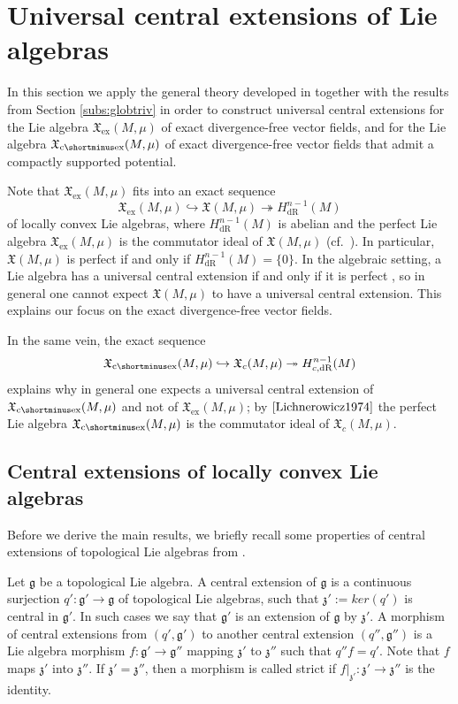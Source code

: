 \documentclass{article}
\newcommand{\ex}{\mathrm{ex}}
\newcommand{\dR}{\mathrm{dR}}
\newcommand{\fX}{\mathfrak{X}}
\newcommand{\fg}{\mathfrak{g}}
\newcommand{\ceX}{\fX_{\mathrm{c}\shortminus\mathrm{ex}}}
\theoremstyle{definition}
\begin{document}
\section{Universal central extensions of Lie algebras}\label{sec:results}
In this section we apply the general theory developed in \cite{Neeb2002} together with the results from Section \ref{subs:globtriv}
 in order to construct universal central extensions for the Lie algebra $\mathfrak X_{\ex}(M,\mu)$ of exact divergence-free vector fields, 
 and for the Lie algebra $\ceX(M,\mu)$ of exact divergence-free vector fields that admit a compactly supported potential.
 
 Note that $\mathfrak X_{\ex}(M,\mu)$ fits into an exact sequence 
 \[
\fX_{\ex}(M,\mu) \hookrightarrow \fX(M,\mu) \twoheadrightarrow H^{n-1}_{\dR}(M)
 \]
 of locally convex Lie algebras, where $H^{n-1}_{\dR}(M)$ is abelian and the perfect Lie algebra $\fX_{\ex}(M,\mu)$ is the commutator ideal of $\fX(M,\mu)$ 
 (cf.~\cite{Lichnerowicz1974}).
In particular, $\mathfrak X(M,\mu)$ is perfect if and only if $H^{n-1}_{\dR}(M) = \{0\}$. In the algebraic setting, a Lie algebra has a universal central extension if and only if it is perfect \cite[\S1]{vdKallen1973}, so in general
one cannot expect $\mathfrak X(M,\mu)$ to have a universal central extension.
This explains our focus on the exact divergence-free vector fields.

In the same vein, the exact sequence  
 \[
	\ceX(M,\mu) \hookrightarrow \fX_{c}(M,\mu) \twoheadrightarrow H^{n-1}_{c, \dR}(M)
 \]
explains why in general one expects a universal central extension of $\ceX(M,\mu)$ and not of $\fX_{\ex}(M,\mu)$; 
by $ \cite{Lichnerowicz1974}$ the perfect Lie algebra $\ceX(M,\mu)$ is the commutator ideal of $\fX_{c}(M,\mu)$.

 

\subsection{Central extensions of locally convex Lie algebras}
Before we derive the main results, we briefly recall some properties of central extensions of topological Lie algebras from \cite{Neeb2002}.


Let $\mathfrak g$ be a topological Lie algebra. A central extension of $\mathfrak g$ is a continuous surjection $q':\mathfrak g'\to\mathfrak g$ of topological Lie algebras, such that $\mathfrak z':=ker(q')$ is central in $\mathfrak{g}'$.
In such cases we say that $\fg'$ is an extension of $\mathfrak g$ by $\mathfrak z'$.
A morphism of central extensions from $(q',\mathfrak g')$ to another central extension $(q'',\mathfrak g'')$ is a Lie algebra morphism $f:\mathfrak g'\to\mathfrak g''$ mapping $\mathfrak{z}'$ to $\mathfrak z''$ such that $q''f=q'$. 
Note that $f$ maps $\mathfrak{z}'$ into $\mathfrak{z}''$. 
If $\mathfrak{z}' = \mathfrak{z}''$, then a morphism is called strict if $f|_{\mathfrak{z}'} \colon \mathfrak{z}' \rightarrow \mathfrak{z}''$ is the identity.
\end{document}
